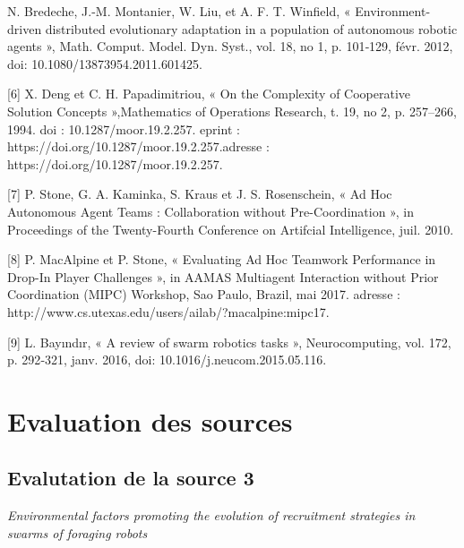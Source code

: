 \documentclass[11pt]{article}
\begin{document}
\begin{flushleft}
[5]	N. Bredeche, J.-M. Montanier, W. Liu, et A. F. T. Winfield, « Environment-driven distributed evolutionary adaptation in a population of autonomous robotic agents », Math. Comput. Model. Dyn. Syst., vol. 18, no 1, p. 101‑129, févr. 2012, doi: 10.1080/13873954.2011.601425.
\vspace*{7mm}

[6] X. Deng et C. H. Papadimitriou, « On the Complexity of Cooperative Solution Concepts »,Mathematics of Operations Research, t. 19, no 2, p. 257–266, 1994. doi : 10.1287/moor.19.2.257. eprint : https://doi.org/10.1287/moor.19.2.257.adresse : https://doi.org/10.1287/moor.19.2.257.
\vspace*{7mm}

[7] P. Stone, G. A. Kaminka, S. Kraus et J. S. Rosenschein, « Ad Hoc Autonomous Agent Teams : Collaboration without Pre-Coordination », in Proceedings of the Twenty-Fourth Conference on Artifcial Intelligence, juil. 2010.
\vspace*{7mm}

[8] P. MacAlpine et P. Stone, « Evaluating Ad Hoc Teamwork Performance in Drop-In Player Challenges », in AAMAS Multiagent Interaction without Prior Coordination (MIPC) Workshop, Sao Paulo, Brazil, mai 2017. adresse : http://www.cs.utexas.edu/users/ailab/?macalpine:mipc17.
\vspace*{7mm}

[9]	L. Bayındır, « A review of swarm robotics tasks », Neurocomputing, vol. 172, p. 292‑321, janv. 2016, doi: 10.1016/j.neucom.2015.05.116.






\section{Evaluation des sources}
 \subsection{Evalutation de la source 3}
 
\textit{ Environmental factors promoting the evolution of recruitment strategies in swarms of foraging robots} 
 

\end{flushleft}
\end{document}
